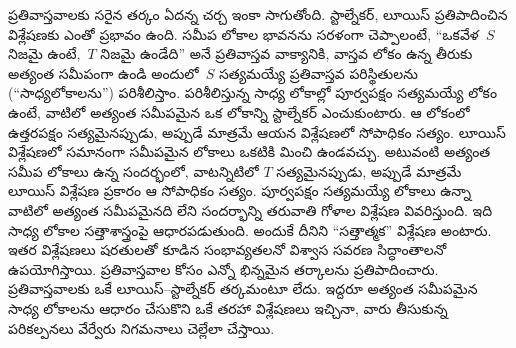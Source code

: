 \documentclass[../../../include/open-logic-section]{subfiles}
\begin{document}
ప్రతివాస్తవాలకు సరైన తర్కం ఏదన్న చర్చ ఇంకా సాగుతోంది.
స్టాల్నేకర్, లూయిస్ ప్రతిపాదించిన విశ్లేషణకు ఎంతో ప్రభావం ఉంది.
సమీప లోకాల భావనను సరళంగా చెప్పాలంటే,
``ఒకవేళ~$S$ నిజమై ఉంటే,~$T$ నిజమై ఉండేది''
అనే ప్రతివాస్తవ వాక్యానికి, వాస్తవ లోకం
ఉన్న తీరుకు అత్యంత సమీపంగా ఉండి
అందులో~$S$ సత్యమయ్యే ప్రతివాస్తవ
పరిస్థితులను (``సాధ్యలోకాలను'') పరిశీలిస్తాం.
పరిశీలిస్తున్న సాధ్య లోకాల్లో పూర్వపక్షం సత్యమయ్యే లోకం ఉంటే,
వాటిలో అత్యంత సమీపమైన ఒక లోకాన్ని స్టాల్నేకర్ ఎంచుకుంటారు.
ఆ లోకంలో ఉత్తరపక్షం సత్యమైనప్పుడు, అప్పుడే మాత్రమే ఆయన విశ్లేషణలో సోపాధికం సత్యం.
లూయిస్ విశ్లేషణలో సమానంగా సమీపమైన లోకాలు ఒకటికి మించి ఉండవచ్చు.
అటువంటి అత్యంత సమీప లోకాలు ఉన్న సందర్భంలో,
వాటన్నిటిలో $T$ సత్యమైనప్పుడు, అప్పుడే మాత్రమే లూయిస్ విశ్లేషణ ప్రకారం
ఆ సోపాధికం సత్యం.
పూర్వపక్షం సత్యమయ్యే లోకాలు ఉన్నా వాటిలో అత్యంత సమీపమైనది
లేని సందర్భాన్ని తరువాతి గోళాల విశ్లేషణ వివరిస్తుంది.
ఇది సాధ్య లోకాల సత్తాశాస్త్రంపై ఆధారపడుతుంది. అందుకే దీనిని
``సత్తాత్మక'' విశ్లేషణ అంటారు. ఇతర విశ్లేషణలు షరతులతో కూడిన
సంభావ్యతలనో విశ్వాస సవరణ సిద్ధాంతాలనో ఉపయోగిస్తాయి.
ప్రతివాస్తవాల కోసం ఎన్నో భిన్నమైన తర్కాలను ప్రతిపాదించారు.
ప్రతివాస్తవాలకు ఒకే లూయిస్--స్టాల్నేకర్ తర్కమంటూ
లేదు. ఇద్దరూ అత్యంత సమీపమైన సాధ్య లోకాలను ఆధారం చేసుకొని
ఒకే తరహా విశ్లేషణలు ఇచ్చినా, వారు తీసుకున్న పరికల్పనలు
వేర్వేరు నిగమనాలు చెల్లేలా చేస్తాయి.
\end{document}
